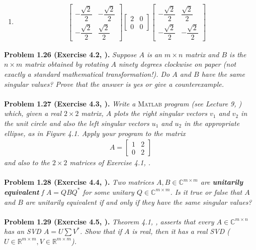 \documentclass[a4paper,oneside]{book}
\numberwithin{equation}{chapter}
\begin{document}
\begin{enumerate}
\begin{align}
{\begin{array}{*{20}{c}}
{\sqrt 2 }&0\\
0&0
\end{array}} \right]\left[ {\begin{array}{*{20}{c}}
{\dfrac{{\sqrt 2 }}{2}}&{ - \dfrac{{\sqrt 2 }}{2}}\\
{\dfrac{{\sqrt 2 }}{2}}&{\dfrac{{\sqrt 2 }}{2}}
\end{array}} \right]
\end{align}
\item
\begin{align}
\left[ {\begin{array}{*{20}{c}}
{ - \dfrac{{\sqrt 2 }}{2}}&{ - \dfrac{{\sqrt 2 }}{2}}\\
{ - \dfrac{{\sqrt 2 }}{2}}&{\dfrac{{\sqrt 2 }}{2}}
\end{array}} \right]\left[ {\begin{array}{*{20}{c}}
2&0\\
0&0
\end{array}} \right]\left[ {\begin{array}{*{20}{c}}
{ - \dfrac{{\sqrt 2 }}{2}}&{\dfrac{{\sqrt 2 }}{2}}\\
{ - \dfrac{{\sqrt 2 }}{2}}&{ - \dfrac{{\sqrt 2 }}{2}}
\end{array}} \right]
\end{align}
\end{enumerate}
\textbf{Problem 1.26 (Exercise 4.2, \cite{1}).} \textit{Suppose $A$ is an $m\times n$ matrix and $B$ is the $n\times m$ matrix obtained by rotating $A$ ninety degrees clockwise on paper (not exactly a standard mathematical transformation!). Do $A$ and $B$ have the same singular values? Prove that the answer is yes or give a counterexample.}\\
\\
\textbf{Problem 1.27 (Exercise 4.3, \cite{1}).} \textit{Write a } \textsc{Matlab}\textit{ program (see Lecture 9, \cite{1}) which, given a real $2\times 2$ matrix, $A$ plots the right singular vectors $v_1$ and $v_2$ in the unit circle and also the left singular vectors $u_1$ and $u_2$ in the appropriate ellipse, as in Figure 4.1. Apply your program to the matrix}
\begin{align}
A = \left[ {\begin{array}{*{20}{c}}
1&2\\
0&2
\end{array}} \right]
\end{align}
\textit{and also to the $2\times 2$ matrices of Exercise 4.1, \cite{1}.}\\
\\
\textbf{Problem 1.28 (Exercise 4.4, \cite{1}).} \textit{Two matrices $A,B\in \mathbb{C}^{m\times m}$ are \textbf{unitarily equivalent} f $A=QBQ^*$ for some unitary $Q\in \mathbb{C}^{m\times m}$. Is it true or false that $A$ and $B$ are unitarily equivalent if and only if they have the same singular values?}\\
\\
\textbf{Problem 1.29 (Exercise 4.5, \cite{1}).} \textit{Theorem 4.1, \cite{1}, asserts that every $A\in \mathbb{C}^{m\times n}$ has an SVD $A=U\sum V^*$. Show that if $A$ is real, then it has a real SVD ($U\in \mathbb{R}^{m\times m},V\in \mathbb{R}^{m\times m}$).}
\end{document}
